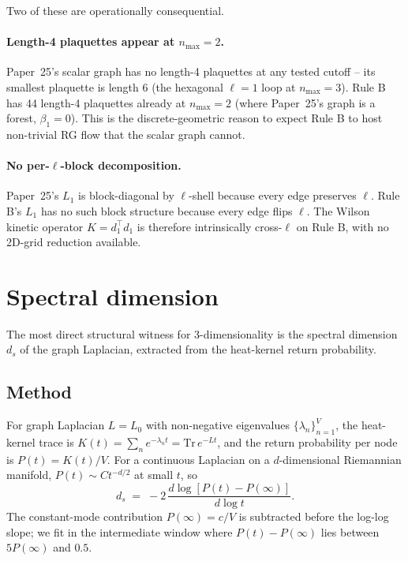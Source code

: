 \documentclass[11pt]{article}
\begin{document}
Two of these are operationally consequential.

\paragraph{Length-4 plaquettes appear at $n_\text{max}=2$.} Paper~25's scalar
graph has no length-4 plaquettes at any tested cutoff -- its smallest plaquette
is length 6 (the hexagonal $\ell=1$ loop at $n_\text{max}=3$). Rule B has 44
length-4 plaquettes already at $n_\text{max}=2$ (where Paper~25's graph is a
forest, $\beta_1=0$). This is the discrete-geometric reason to expect Rule B to
host non-trivial RG flow that the scalar graph cannot.

\paragraph{No per-$\ell$-block decomposition.} Paper~25's $L_1$ is block-diagonal
by $\ell$-shell because every edge preserves $\ell$. Rule B's $L_1$ has no such
block structure because every edge flips $\ell$. The Wilson kinetic operator
$K=d_1^\top d_1$ is therefore intrinsically cross-$\ell$ on Rule B, with no
2D-grid reduction available.

\section{Spectral dimension}
\label{sec:spectral_dim}

The most direct structural witness for 3-dimensionality is the spectral
dimension $d_s$ of the graph Laplacian, extracted from the heat-kernel return
probability.

\subsection{Method}

For graph Laplacian $L=L_0$ with non-negative eigenvalues
$\{\lambda_n\}_{n=1}^V$, the heat-kernel trace is
$K(t)=\sum_n e^{-\lambda_n t}=\mathrm{Tr}\,e^{-Lt}$, and the return
probability per node is $P(t)=K(t)/V$. For a continuous Laplacian on a
$d$-dimensional Riemannian manifold, $P(t)\sim Ct^{-d/2}$ at small $t$, so
\begin{equation}
d_s\;=\;-2\,\frac{d\log[P(t)-P(\infty)]}{d\log t}.
\end{equation}
The constant-mode contribution $P(\infty)=c/V$ is subtracted before the
log-log slope; we fit in the intermediate window where $P(t)-P(\infty)$ lies
between $5P(\infty)$ and $0.5$.
\end{document}
